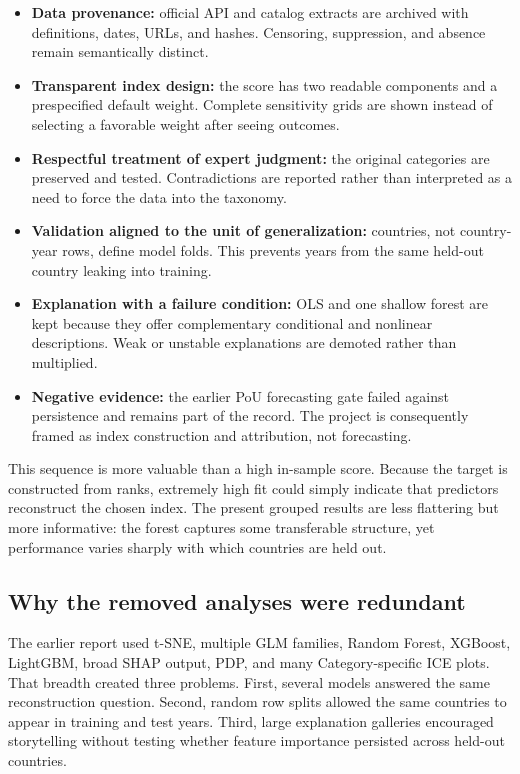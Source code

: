 \documentclass[11pt]{article}
\begin{document}
\begin{itemize}
  \item \textbf{Data provenance:} official API and catalog extracts are archived with definitions, dates, URLs, and hashes. Censoring, suppression, and absence remain semantically distinct.
  \item \textbf{Transparent index design:} the score has two readable components and a prespecified default weight. Complete sensitivity grids are shown instead of selecting a favorable weight after seeing outcomes.
  \item \textbf{Respectful treatment of expert judgment:} the original categories are preserved and tested. Contradictions are reported rather than interpreted as a need to force the data into the taxonomy.
  \item \textbf{Validation aligned to the unit of generalization:} countries, not country-year rows, define model folds. This prevents years from the same held-out country leaking into training.
  \item \textbf{Explanation with a failure condition:} OLS and one shallow forest are kept because they offer complementary conditional and nonlinear descriptions. Weak or unstable explanations are demoted rather than multiplied.
  \item \textbf{Negative evidence:} the earlier PoU forecasting gate failed against persistence and remains part of the record. The project is consequently framed as index construction and attribution, not forecasting.
\end{itemize}

This sequence is more valuable than a high in-sample score. Because the target is constructed from ranks, extremely high fit could simply indicate that predictors reconstruct the chosen index. The present grouped results are less flattering but more informative: the forest captures some transferable structure, yet performance varies sharply with which countries are held out.

\subsection{Why the removed analyses were redundant}

The earlier report used t-SNE, multiple GLM families, Random Forest, XGBoost, LightGBM, broad SHAP output, PDP, and many Category-specific ICE plots. That breadth created three problems. First, several models answered the same reconstruction question. Second, random row splits allowed the same countries to appear in training and test years. Third, large explanation galleries encouraged storytelling without testing whether feature importance persisted across held-out countries.
\end{document}
